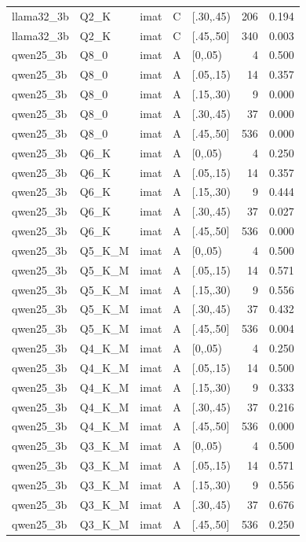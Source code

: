 \begin{tabular}{lllllrr}
llama32\_3b & Q2\_K & imat & C & [.30,.45) & 206 & 0.194 \\
llama32\_3b & Q2\_K & imat & C & [.45,.50] & 340 & 0.003 \\
qwen25\_3b & Q8\_0 & imat & A & [0,.05) & 4 & 0.500 \\
qwen25\_3b & Q8\_0 & imat & A & [.05,.15) & 14 & 0.357 \\
qwen25\_3b & Q8\_0 & imat & A & [.15,.30) & 9 & 0.000 \\
qwen25\_3b & Q8\_0 & imat & A & [.30,.45) & 37 & 0.000 \\
qwen25\_3b & Q8\_0 & imat & A & [.45,.50] & 536 & 0.000 \\
qwen25\_3b & Q6\_K & imat & A & [0,.05) & 4 & 0.250 \\
qwen25\_3b & Q6\_K & imat & A & [.05,.15) & 14 & 0.357 \\
qwen25\_3b & Q6\_K & imat & A & [.15,.30) & 9 & 0.444 \\
qwen25\_3b & Q6\_K & imat & A & [.30,.45) & 37 & 0.027 \\
qwen25\_3b & Q6\_K & imat & A & [.45,.50] & 536 & 0.000 \\
qwen25\_3b & Q5\_K\_M & imat & A & [0,.05) & 4 & 0.500 \\
qwen25\_3b & Q5\_K\_M & imat & A & [.05,.15) & 14 & 0.571 \\
qwen25\_3b & Q5\_K\_M & imat & A & [.15,.30) & 9 & 0.556 \\
qwen25\_3b & Q5\_K\_M & imat & A & [.30,.45) & 37 & 0.432 \\
qwen25\_3b & Q5\_K\_M & imat & A & [.45,.50] & 536 & 0.004 \\
qwen25\_3b & Q4\_K\_M & imat & A & [0,.05) & 4 & 0.250 \\
qwen25\_3b & Q4\_K\_M & imat & A & [.05,.15) & 14 & 0.500 \\
qwen25\_3b & Q4\_K\_M & imat & A & [.15,.30) & 9 & 0.333 \\
qwen25\_3b & Q4\_K\_M & imat & A & [.30,.45) & 37 & 0.216 \\
qwen25\_3b & Q4\_K\_M & imat & A & [.45,.50] & 536 & 0.000 \\
qwen25\_3b & Q3\_K\_M & imat & A & [0,.05) & 4 & 0.500 \\
qwen25\_3b & Q3\_K\_M & imat & A & [.05,.15) & 14 & 0.571 \\
qwen25\_3b & Q3\_K\_M & imat & A & [.15,.30) & 9 & 0.556 \\
qwen25\_3b & Q3\_K\_M & imat & A & [.30,.45) & 37 & 0.676 \\
qwen25\_3b & Q3\_K\_M & imat & A & [.45,.50] & 536 & 0.250 \\

\end{tabular}
